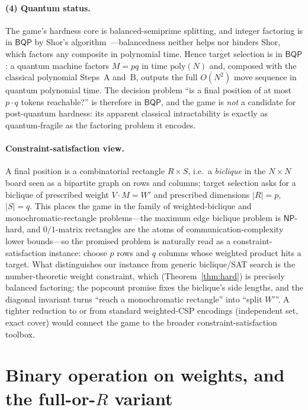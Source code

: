 \documentclass[11pt]{article}
\theoremstyle{definition}
\theoremstyle{plain}
\theoremstyle{remark}
\begin{document}
\paragraph{(4) Quantum status.}
The game's hardness core is balanced-semiprime splitting, and integer factoring is in
$\mathsf{BQP}$ by Shor's algorithm~\cite{shor}---balancedness neither helps nor hinders
Shor, which factors any composite in polynomial time. Hence target selection is in $\mathsf{BQP}$: a
quantum machine factors $M=pq$ in time $\mathrm{poly}(N)$ and, composed with the classical
polynomial Steps~A and~B, outputs the full $O(N^2)$ move sequence in quantum polynomial
time. The decision problem ``is a final position of at most $p\cdot q$ tokens reachable?''
is therefore in $\mathsf{BQP}$, and the game is \emph{not} a candidate for post-quantum
hardness: its apparent classical intractability is exactly as quantum-fragile as the
factoring problem it encodes.

\paragraph{Constraint-satisfaction view.}
A final position is a combinatorial rectangle $R\times S$, i.e.\ a \emph{biclique} in the
$N\times N$ board seen as a bipartite graph on rows and columns; target selection asks for a
biclique of prescribed weight $V\cdot M=W'$ and prescribed dimensions $|R|=p$, $|S|=q$. This
places the game in the family of weighted-biclique and monochromatic-rectangle problems---the
maximum edge biclique problem is $\mathsf{NP}$-hard, and $0/1$-matrix rectangles are the
atoms of communication-complexity lower bounds---so the promised problem is naturally read as
a constraint-satisfaction instance: choose $p$ rows and $q$ columns whose weighted product
hits a target. What distinguishes our instance from generic biclique/SAT search is the
number-theoretic weight constraint, which (Theorem~\ref{thm:hard}) is precisely balanced
factoring; the popcount promise fixes the biclique's side lengths, and the diagonal invariant
turns ``reach a monochromatic rectangle'' into ``split $W'$''. A tighter reduction to or from
standard weighted-CSP encodings (independent set, exact cover) would connect the game to the
broader constraint-satisfaction toolbox.

\appendix
\renewcommand{\thesection}{Appendix~\Alph{section}}

\section{Binary operation on weights, and the full-or-\texorpdfstring{$R$}{R} variant}\label{sec:hash}
\end{document}
